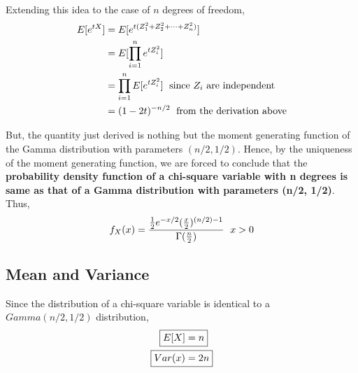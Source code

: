 \documentclass[../probability-notes.tex]{subfiles}
\begin{document}
    Extending this idea to the case of $n$ degrees of freedom,
    \begin{align*}
        E[e^{tX}] &= E[e^{t(Z_{1}^{2} + Z_{2}^{2} + \cdots + Z_{n}^{2})}]\\
        &= E[\prod_{i=1}^{n} e^{t Z_{i}^{2}}]\\
        &= \prod_{i=1}^{n} E[e^{t Z_{i}^{2}}] \text{\; since $Z_{i}$ are independent}\\
        &= (1 - 2t)^{-n/2} \text{\; from the derivation above}
    \end{align*}

    But, the quantity just derived is nothing but the moment generating function of the Gamma distribution with parameters $(n/2, 1/2)$. Hence, by the uniqueness of the moment generating function, we are forced to conclude that the \textbf{probability density function of a chi-square variable with n degrees is same as that of a Gamma distribution with parameters (n/2, 1/2)}.\newline
    Thus,
    \begin{align*}
        f_{X}(x) = \frac{\frac{1}{2} e^{-x/2} (\frac{x}{2})^{(n/2) - 1}}{\Gamma(\frac{n}{2})} \text{\; $x > 0$}
    \end{align*}
    \subsection{Mean and Variance}
    Since the distribution of a chi-square variable is identical to a $Gamma(n/2, 1/2)$ distribution,
    \begin{align*}
        \Aboxed{E[X] &= n}\\
        \Aboxed{Var(x) &= 2n}
    \end{align*}
\end{document}
